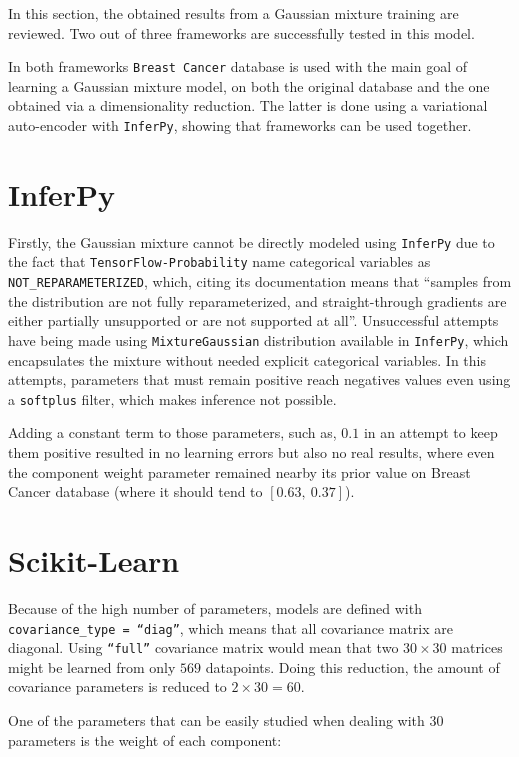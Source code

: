 
In this section, the obtained results from a Gaussian mixture training are reviewed. Two out of three frameworks are successfully tested in this model.

In both frameworks \texttt{Breast Cancer} database is used with the main goal of learning a Gaussian mixture model, on both the original database and the one obtained via a dimensionality reduction. The latter is done using a variational auto-encoder with \texttt{InferPy}, showing that frameworks can be used together.

\section{InferPy}

Firstly, the Gaussian mixture cannot be directly modeled using \texttt{InferPy} due to the fact that \texttt{TensorFlow}\texttt{-Probability} name categorical variables as \texttt{NOT\_REPARAMETERIZED}, which, citing its documentation means that ``samples from the distribution are not fully reparameterized, and straight-through gradients are either partially unsupported or are not supported at all''. Unsuccessful attempts have being made using \texttt{MixtureGaussian} distribution available in \texttt{InferPy}, which encapsulates the mixture without needed explicit categorical variables. In this attempts, parameters that must remain positive reach negatives values even using a \texttt{softplus} filter, which makes inference not possible.

Adding a constant term to those parameters, such as, \(0.1\) in an attempt to keep them positive resulted in no learning errors but also no real results, where even the component weight parameter remained nearby its prior value on Breast Cancer database (where it should tend to \([0.63,\ 0.37]\)).


\section{Scikit-Learn}

Because of the high number of parameters, models are defined with \texttt{covariance\_type = ``diag''}, which means that all covariance matrix are diagonal. Using \texttt{``full''} covariance matrix would mean that two \(30 \times 30\) matrices might be learned from only \(569\) datapoints. Doing this reduction, the amount of covariance parameters is reduced to \(2\times 30 = 60\).

One of the parameters that can be easily studied when dealing with \(30\) parameters is the weight of each component:

